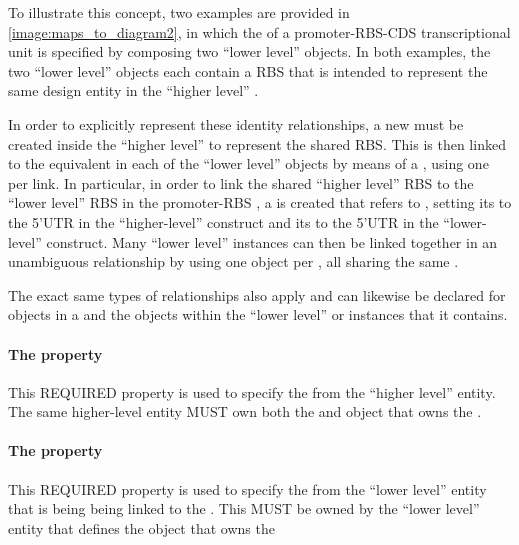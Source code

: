 To illustrate this concept, two examples are provided in \ref{image:maps_to_diagram2}, in which the  of a promoter-RBS-CDS transcriptional unit is specified by composing two ``lower level''  objects.
In both examples, the two ``lower level''  objects each contain a RBS that is intended to represent the same design entity in the ``higher level'' .

In order to explicitly represent these identity relationships, a new  must be created inside the ``higher level''  to represent the shared RBS.  
This  is then linked to the equivalent  in each of the ``lower level''  objects by means of a , using one  per link.  
In particular, in order to link the shared ``higher level'' RBS to the ``lower level'' RBS in the promoter-RBS , a  is created   that refers to , setting its  to the 5'UTR  in the ``higher-level'' construct and its  to the 5'UTR  in the ``lower-level'' construct.
Many ``lower level'' instances can then be linked together in an unambiguous relationship by using one  object per , all sharing the same .

The exact same types of relationships also apply and can likewise be declared for  objects in a  and the 
 objects within the ``lower level''  or  instances that it contains.


\paragraph{The  property}\label{sec:local}
This REQUIRED property is used to specify the  from the ``higher level'' entity.  The same higher-level entity MUST own both the  and object that owns the .

\paragraph{The  property}\label{sec:remote}
This REQUIRED property is used to specify the  from the ``lower level'' entity that is being being linked to the  .  This  MUST be owned by the ``lower level'' entity that defines the object that owns the 

